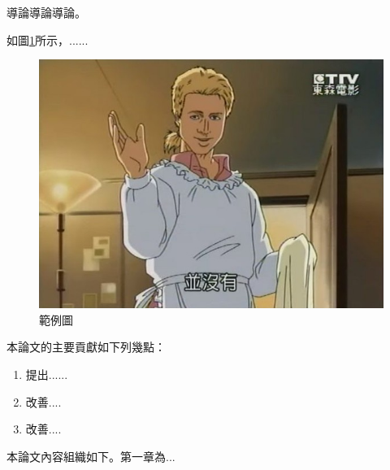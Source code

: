 導論導論導論\cite{Girshick2015}。\par

如圖\ref{fig1}所示，......\par
\begin{figure}[ht]
	\centering
	\includegraphics[scale=0.5]{"content/images/d3420288"}
	\caption{範例圖}
	\label{fig1}
\end{figure}\par


本論文的主要貢獻如下列幾點：
\begin{enumerate}
    \item  
    提出......
    \item 
    改善....
    \item
    改善....
\end{enumerate} 

本論文內容組織如下。第一章為...\par








